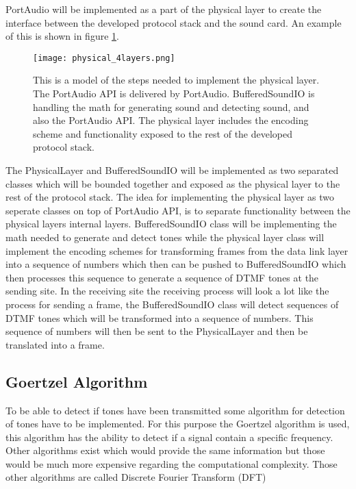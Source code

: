 	PortAudio will be implemented as a part of the physical layer to create the interface between the developed
	protocol stack and the sound card. An example of this is shown in figure \ref{fig:physical_4layers}.
	
	\begin{figure}[htb]
		\begin{center}
		\texttt{[image: physical\_4layers.png]}%
		\caption{This is a model of the steps needed to implement the physical layer. The PortAudio API is delivered
		by PortAudio. BufferedSoundIO is handling the math for generating sound and detecting sound, and also the
		PortAudio API. The physical layer includes the encoding scheme and functionality exposed to the rest of the
		developed protocol stack.}
		\label{fig:physical_4layers}
		\end{center}
	\end{figure}
	
	The PhysicalLayer and BufferedSoundIO will be implemented as two separated classes which will be bounded together
	and exposed as the physical layer to the rest of the protocol stack. The idea for implementing the physical layer
	as two seperate classes on top of PortAudio API, is to separate functionality between the physical layers internal
	layers. BufferedSoundIO class will be implementing the math needed to generate and detect tones while the physical
	layer class will implement the encoding schemes for transforming frames from the data link layer into a sequence of
	numbers which then can be pushed to BufferedSoundIO which then processes this sequence to generate a sequence of DTMF
	tones at the sending site. In the receiving site the receiving process will look a lot like the process for sending a
	frame, the BufferedSoundIO class will detect sequences of DTMF tones which will be transformed into a sequence of
	numbers. This sequence of numbers will then be sent to the PhysicalLayer and then be translated into a frame.
	
	\subsection{Goertzel Algorithm}
	To be able to detect if tones have been transmitted some algorithm for detection of tones have to be implemented.
	For this purpose the Goertzel algorithm is used, this algorithm has the ability to detect if a signal contain a
	specific frequency. Other algorithms exist which would provide the same information but those would be
	much more expensive regarding the computational complexity. Those other algorithms are called Discrete Fourier Transform (DFT)
	
